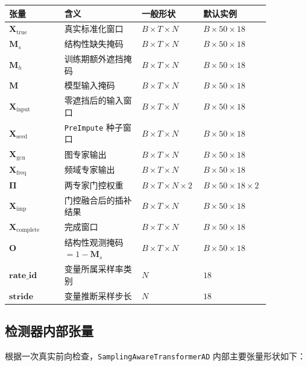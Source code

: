 \documentclass[UTF8]{ctexart}
\begin{document}
{\small
\setlength{\tabcolsep}{4pt}
\begin{longtable}{@{}>{\raggedright\arraybackslash}p{0.20\linewidth} >{\raggedright\arraybackslash}p{0.28\linewidth} >{\raggedright\arraybackslash}p{0.17\linewidth} >{\raggedright\arraybackslash}p{0.21\linewidth}@{}}
\toprule
张量 & 含义 & 一般形状 & 默认实例 \\
\midrule
\endhead
\(\bm{X}_{\text{true}}\) & 真实标准化窗口 & \(B\times T\times N\) & \(B\times 50\times 18\) \\
\(\bm{M}_s\) & 结构性缺失掩码 & \(B\times T\times N\) & \(B\times 50\times 18\) \\
\(\bm{M}_h\) & 训练期额外遮挡掩码 & \(B\times T\times N\) & \(B\times 50\times 18\) \\
\(\bm{M}\) & 模型输入掩码 & \(B\times T\times N\) & \(B\times 50\times 18\) \\
\(\bm{X}_{\text{input}}\) & 零遮挡后的输入窗口 & \(B\times T\times N\) & \(B\times 50\times 18\) \\
\(\bm{X}_{\text{seed}}\) & \texttt{PreImpute} 种子窗口 & \(B\times T\times N\) & \(B\times 50\times 18\) \\
\(\bm{X}_{\text{gcn}}\) & 图专家输出 & \(B\times T\times N\) & \(B\times 50\times 18\) \\
\(\bm{X}_{\text{freq}}\) & 频域专家输出 & \(B\times T\times N\) & \(B\times 50\times 18\) \\
\(\bm{\Pi}\) & 两专家门控权重 & \(B\times T\times N\times 2\) & \(B\times 50\times 18\times 2\) \\
\(\bm{X}_{\text{imp}}\) & 门控融合后的插补结果 & \(B\times T\times N\) & \(B\times 50\times 18\) \\
\(\bm{X}_{\text{complete}}\) & 完成窗口 & \(B\times T\times N\) & \(B\times 50\times 18\) \\
\(\bm{O}\) & 结构性观测掩码 \(=1-\bm{M}_s\) & \(B\times T\times N\) & \(B\times 50\times 18\) \\
\(\bm{rate\_id}\) & 变量所属采样率类别 & \(N\) & \(18\) \\
\(\bm{stride}\) & 变量推断采样步长 & \(N\) & \(18\) \\
\bottomrule
\end{longtable}
}

\subsection{检测器内部张量}

根据一次真实前向检查，\texttt{SamplingAwareTransformerAD} 内部主要张量形状如下：
\end{document}
